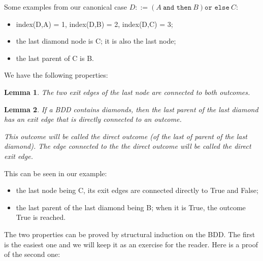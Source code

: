 \documentclass[a4paper,12pt,twoside]{article}
\newcommand{\andthen}{\texttt{and then}}
\newcommand{\orelse}{\texttt{or else}}
\newtheorem{lemma}{Lemma}[subsection]
\begin{document}
Some examples from our canonical case
$D ::= (A \ \andthen{} \ B) \orelse{} \ C$:
\begin{itemize}
\item index(D,A) = 1, index(D,B) = 2, index(D,C) = 3;
\item the last diamond node is C; it is also the last node;
\item the last parent of C is B.
\end{itemize}

We have the following properties:

\begin{lemma}
  \label{lemma:last-node}
  The two exit edges of the last node are connected to both outcomes.
\end{lemma}

\begin{lemma}
  \label{lemma:last-parent-of-the-last-diamond}
   If a BDD contains diamonds, then the last parent of the last diamond
   has an exit edge that is directly connected to an outcome.

   This outcome will be called the direct outcome (of the last of parent of
   the last diamond). The edge connected to the the direct outcome will be
   called the direct exit edge.
\end{lemma}

This can be seen in our example:
\begin{itemize}
\item the last node being C, its exit edges are connected directly to True and
      False;
\item the last parent of the last diamond being B; when it is True, the outcome
      True is reached.
\end{itemize}

The two properties can be proved by structural induction on the BDD.
The first is the easiest one and we will keep it as an exercise for the
reader. Here is a proof of the second one:
\end{document}
